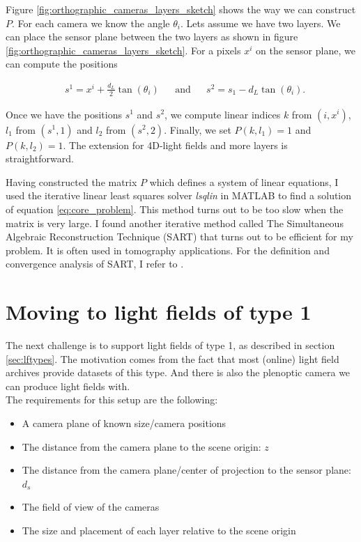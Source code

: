 \documentclass[11pt,a4paper,titlepage]{article}
\begin{document}
Figure \ref{fig:orthographic_cameras_layers_sketch} shows the way we can construct $P$. For each camera we know the angle $\theta_i$. Lets assume we have two layers. We can place the sensor plane between the two layers as shown in figure \ref{fig:orthographic_cameras_layers_sketch}. For a pixels $x^i$ on the sensor plane, we can compute the positions

\begin{align*}
	& s^1 = x^i + \frac{d_L}{2}\tan\left( \theta_i \right) && \text{and} && s^2 = s_1 - d_L \tan\left( \theta_i \right) \text{.}
\end{align*}

Once we have the positions $s^1$ and $s^2$, we compute linear indices $k$ from $\left(i, x^i\right)$, $l_1$ from $\left(s^1, 1\right)$ and $l_2$ from $\left(s^2, 2\right)$. Finally, we set $P\left(k, l_1\right) = 1$ and $P\left(k, l_2\right) = 1$. The extension for 4D-light fields and more layers is straightforward.

Having constructed the matrix $P$ which defines a system of linear equations, I used the iterative  linear least squares solver \emph{lsqlin} in MATLAB to find a solution of equation \ref{eq:core_problem}. This method turns out to be too slow when the matrix is very large. I found another iterative method called The Simultaneous Algebraic Reconstruction Technique (SART) that turns out to be efficient for my problem. It is often used in tomography applications. For the definition and convergence analysis of SART, I refer to \cite{CONV_SART}. 

\section{Moving to light fields of type 1}
The next challenge is to support light fields of type 1, as described in section \ref{sec:lftypes}. The motivation comes from the fact that most (online) light field archives provide datasets of this type. And there is also the plenoptic camera we can produce light fields with. 
\\
The requirements for this setup are the following:

\begin{itemize}
	\item A camera plane of known size/camera positions
	\item The distance from the camera plane to the scene origin: $z$
	\item The distance from the camera plane/center of projection to the sensor plane: $d_s$
	\item The field of view of the cameras
	\item The size and placement of each layer relative to the scene origin
\end{itemize}
\end{document}
